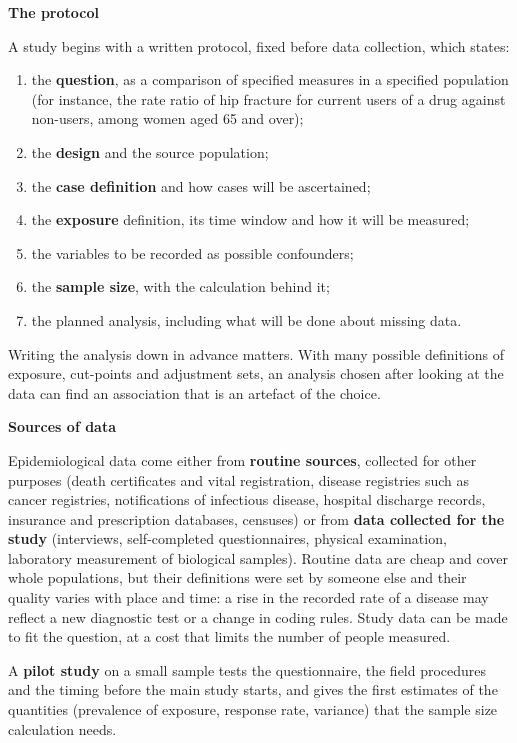 \documentclass[11pt,a4paper]{article}
\numberwithin{equation}{section}
\theoremstyle{definition}
\newcommand{\subhead}[1]{%
  \par\medskip\noindent\textbf{#1}\par\nobreak\smallskip}
\begin{document}
\subhead{The protocol}

A study begins with a written protocol, fixed before data collection, which states:
\begin{enumerate}
\item the \textbf{question}, as a comparison of specified measures in a specified population (for instance, the rate ratio of hip fracture
for current users of a drug against non-users, among women aged 65 and over);
\item the \textbf{design} and the source population;
\item the \textbf{case definition} and how cases will be ascertained;
\item the \textbf{exposure} definition, its time window and how it will be measured;
\item the variables to be recorded as possible confounders;
\item the \textbf{sample size}, with the calculation behind it;
\item the planned analysis, including what will be done about missing data.
\end{enumerate}
Writing the analysis down in advance matters. With many possible definitions of exposure, cut-points and adjustment sets, an analysis
chosen after looking at the data can find an association that is an artefact of the choice.

\subhead{Sources of data}

Epidemiological data come either from \textbf{routine sources}, collected for other purposes (death certificates and vital registration, disease
registries such as cancer registries, notifications of infectious disease, hospital discharge records, insurance and prescription
databases, censuses) or from \textbf{data collected for the study} (interviews, self-completed questionnaires, physical examination,
laboratory measurement of biological samples). Routine data are cheap and cover whole populations, but their definitions were set by
someone else and their quality varies with place and time: a rise in the recorded rate of a disease may reflect a new diagnostic test or a
change in coding rules. Study data can be made to fit the question, at a cost that limits the number of people measured.

A \textbf{pilot study} on a small sample tests the questionnaire, the field procedures and the timing before the main study starts, and
gives the first estimates of the quantities (prevalence of exposure, response rate, variance) that the sample size calculation needs.
\end{document}
